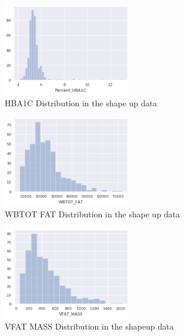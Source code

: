 \begin{figure}[!htb]
        \caption{HBA1C Distribution in the shape up data}
        \centering
        \includegraphics[width=0.5\textwidth]{images/hba1c.png}
\end{figure}

\begin{figure}[!htb]
        \caption{WBTOT FAT Distribution in the shape up data}
        \centering
        \includegraphics[width=0.5\textwidth]{images/wbtot_fat.png}
\end{figure}


\begin{figure}[!htb]
        \caption{VFAT MASS Distribution in the shapeup data}
        \centering
        \includegraphics[width=0.5\textwidth]{images/vfat_mass.png}
\end{figure}

